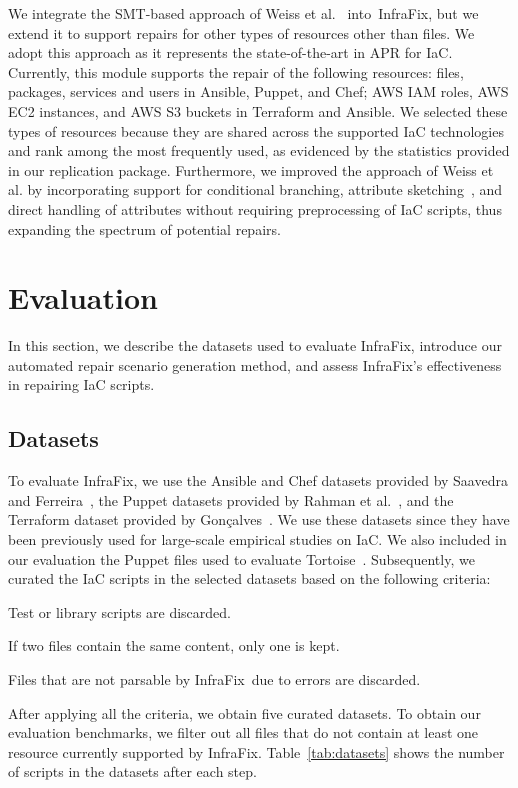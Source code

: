 \documentclass[sigconf,nonacm]{acmart}
\def\name{{\sc InfraFix}}
\begin{document}
We integrate the SMT-based approach of Weiss et al.~\cite{weiss2017tortoise} into~\name, but we extend it to support repairs for other types of resources other than files. We adopt this approach as it represents the state-of-the-art in APR for IaC.
Currently, this module supports the repair of the following resources: files, packages, services and users in Ansible, Puppet, and Chef; AWS IAM roles, AWS EC2 instances, and AWS S3 buckets in Terraform and Ansible. We selected these types of resources because they are shared across the supported IaC technologies and rank among the most frequently used, as evidenced by the statistics provided in our replication package.
Furthermore, we improved the approach of Weiss et al. by incorporating support for conditional branching, attribute sketching~\cite{solar2006combinatorial}, and direct handling of attributes without requiring preprocessing of IaC scripts, thus expanding the spectrum of potential repairs. 

\section{Evaluation}
In this section, we describe the datasets used to evaluate \name, introduce our automated repair scenario generation method, and assess \name’s effectiveness in repairing IaC scripts.

\subsection{Datasets}



To evaluate \name, we use
the Ansible and Chef datasets provided by Saavedra and Ferreira~\cite{saavedra2022glitch}, the Puppet datasets provided by Rahman et al.~\cite{rahman2019seven}, and the Terraform dataset provided by Gonçalves~\cite{goncalves2023}. We use these datasets since they have been previously used for large-scale empirical studies on IaC.
We also included in our evaluation the Puppet files used to evaluate Tortoise~\cite{weiss2017tortoise}.
Subsequently, we curated the IaC scripts in the selected datasets based on the following criteria:
\begin{enumerate*}
    \item Test or library scripts are discarded. 
    \item If two files contain the same content, only one is kept.
    \item Files that are not parsable by \name\ due to errors are discarded.
\end{enumerate*}
After applying all the criteria, we obtain five curated datasets. To obtain our evaluation benchmarks, we filter out all files that do not contain at least one resource currently supported by \name.
Table~\ref{tab:datasets} shows the number of scripts in the datasets after each step. 
\end{document}
